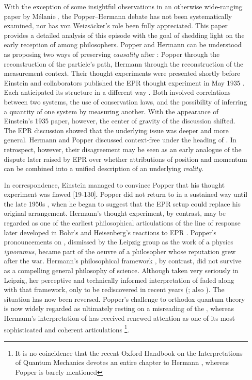 \documentclass[pdflatex]{sn-jnl}
\renewcommand{\cite}{\citealp}
\newcommand{\TE}{thought experiment\xspace}
\newcommand{\vW}{von Weizsäcker\xspace}
\begin{document}

With the exception of some insightful observations in an otherwise wide-ranging paper by Mélanie \citet{Frappier2016}, the Popper--Hermann debate has not been systematically examined, nor has \vW's role been fully appreciated. This paper provides a detailed analysis of this episode with the goal of shedding light on the early reception of \qm among philosophers. Popper and Hermann can be understood as proposing two ways of preserving \emph{causality} after \qm: Popper through the reconstruction of the particle's path, Hermann through the reconstruction of the measurement context. Their thought experiments were presented shortly before Einstein and collaborators published the EPR \TE in May 1935 \citep{Einstein1935}. Each anticipated its structure in a different way \citep[176--181]{Jammer1974}. Both involved correlations between two systems, the use of conservation laws, and the possibility of inferring a quantity of one system by measuring another. With the appearance of Einstein's 1935 paper, however, the center of gravity of the discussion shifted. The EPR discussion showed that the underlying issue was deeper and more general. Hermann and Popper discussed context-free  under the heading of . In retrospect, however, their disagreement may be seen as an early analogue of the dispute later raised by EPR over whether attributions of position and momentum can be combined into a unified description of an underlying \emph{reality}.

In correspondence, Einstein managed to convince Popper that his \TE was flawed [19-130]. Popper did not return to \qm in a sustained way until the late 1950s \citep{DelSanto2019}, when he began to suggest that the EPR setup could replace his original arrangement. Hermann’s \TE, by contrast, may be regarded as one of the earliest philosophical articulations of the line of response later developed in Bohr’s and Heisenberg’s reactions to EPR \citep[sec.~4.4]{BacciagaluppiCrull2024}. Popper’s pronouncements on \qm, dismissed by the Leipzig group as the work of a physics \textit{ignoramus}, became part of the oeuvre of a philosopher whose reputation grew after the war. Hermann’s philosophical framework \citep{Reichenberger2026}, by contrast, did not survive as a compelling general philosophy of science. Although taken very seriously in Leipzig, her perceptive and technically informed interpretation of \qm faded along with that framework, only to be rediscovered in recent years (\cite{Crull2017}; also \cite{Crull2022,Cuffaro2022,Reichenberger2026}). The situation has now been reversed. Popper’s challenge to orthodox quantum theory is now widely regarded as ultimately resting on a misreading of the  \citep{Howard2012}, whereas Hermann’s interpretation of \qm has received renewed attention as one of its most sophisticated and coherent articulations \citep{Bacciagaluppi2025}\footnote{It is no coincidence that the recent Oxford Handbook on the Interpretations of Quantum Mechanics \citep{Freire2022} devotes an entire chapter to Hermann \citep{Crull2022}, whereas Popper is barely mentioned}.
\end{document}

